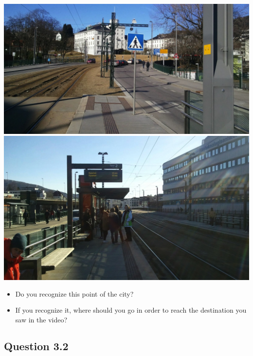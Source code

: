 \documentclass[12pt,a4paper,openright, notitlepage]{report}
\begin{document}
\includegraphics[width=\textwidth]{imgs/image-question31-1}
\includegraphics[width=\textwidth]{imgs/image-question31-2}

\begin{itemize}
	\item Do you recognize this point of the city?
	\item If you recognize it, where should you go in order to reach the destination you saw in the video?
\end{itemize}

\newpage

\subsection{Question 3.2}
\end{document}
